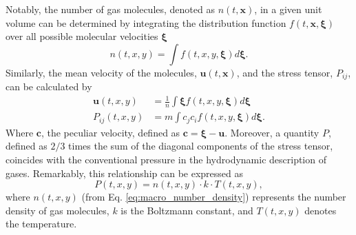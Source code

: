 Notably, the number of gas molecules, denoted as $n(t,\mathbf{x})$, in a given unit volume can be determined by integrating the distribution function $f(t,\mathbf{x},\boldsymbol{\xi})$ over all possible molecular velocities $\boldsymbol{\xi}$\cite{kogan1969rarefied}
\begin{equation} \label{eq:macro_number_density}
    n\left(t,x,y\right)
    =
    \int f\left(t,x,y,\boldsymbol{\xi}\right)d \boldsymbol{\xi}
    .
\end{equation}
Similarly, the mean velocity of the molecules, $\mathbf{u}(t,\mathbf{x})$, and the stress tensor, $P_{ij}$, can be calculated by
\begin{align}
    \mathbf{u}\left(t,x,y\right) &= \frac{1}{n}\int \boldsymbol{\xi}f\left(t,x,y,\boldsymbol{\xi}\right) d\boldsymbol{\xi} \label{eq:macro_velocity} \\
    P_{ij}\left(t,x,y\right) &= m\int c_jc_i f\left(t,x,y,\boldsymbol{\xi}\right) d\boldsymbol{\xi} \label{eq:macro_stress}
    .
\end{align}
Where $\mathbf{c}$, the peculiar velocity, defined as $\mathbf{c}=\boldsymbol{\xi}-\mathbf{u}$.
Moreover, a quantity $P$, defined as $2/3$ times the sum of the diagonal components of the stress tensor, coincides with the conventional pressure in the hydrodynamic description of gases. Remarkably, this relationship can be expressed as
\begin{equation}
    P(t,x,y)=n(t,x,y)\cdot k\cdot T(t,x,y)
    ,
\end{equation}
where $n(t,x,y)$ (from Eq. \ref{eq:macro_number_density}) represents the number density of gas molecules, $k$ is the Boltzmann constant, and $T(t,x,y)$ denotes the temperature.